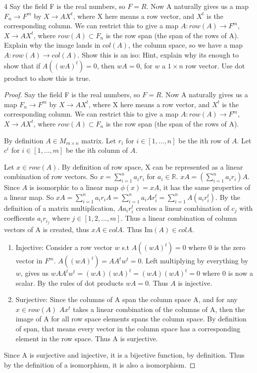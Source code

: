 \documentclass{article}
\newcommand{\R}{\mathbb{R}}
\newcommand{\rarr}[0]{\rightarrow}
\newcommand{\IM}[1]{\text{Im}(#1)}
\begin{document}
\bigskip

\begin{PROB}{4}\label{Problem 4.}
	Say the field F is the real numbers, so $F = R$. Now A naturally gives us a map $F_n \rarr F^m$ by $X \rarr A X^t$, where X here means a row vector, and $X^t$ is the corresponding column. We can restrict this to give a map $A: row(A) \rarr F^m$, $X \rarr AX^t$, where $row(A) \subset F_n$ is the row span (the span of the rows of A). Explain why the image lands in $col(A)$, the column space, so we have a map $A: row(A) \rarr col(A)$.  Show this is an iso: Hint, explain why its enough to show that if  $A( (w A)^t) = 0$, then $wA = 0$, for $w$ a $1 \times n$ row vector.  Use dot product to show this is true.
\end{PROB}
\begin{proof}
	Say the field F is the real numbers, so $F = R$. Now A naturally gives us a map $F_n \rarr F^m$ by $X \rarr A X^t$, where X here means a row vector, and $X^t$ is the corresponding column. We can restrict this to give a map $A: row(A) \rarr F^m$, $X \rarr AX^t$, where $row(A) \subset F_n$ is the row span (the span of the rows of A).

	By definition $A \in M_{m \times n}$ matrix. Let $r_i$ for $i \in [1, ..., n]$ be the ith row of $A$. Let $c^i$ for $i \in [1, \ldots, m]$ be the ith column of $A$. 
	
	
	Let $x \in row(A)$. By definition of row space, X can be represented as a linear combination of row vectors. So $x = \sum_{i = 1}^{n}a_ir_i$ for $a_i \in \R$. $xA = (\sum_{i = 1}^{n}a_ir_i)A$. Since $A$ is isomorphic to a linear map $\phi(x) = xA$, it has the same properties of a linear map. So $xA = \sum_{i = 1}^n a_ir_iA = \sum_{i = 1}^n a_iAr_i^t = \sum_{i = 1}^n A(a_ir_i^t)$. By the definition of a matrix multiplication, $Aa_ir_i^t$ creates a linear combination of $c_j$ with coefficents $a_ir_{i_j}$ where $j \in [1, 2, ..., m]$. Thus a linear combination of column vectors of A is created, thus $xA \in col A$. Thus $\IM{A} \in col A$.
	
	\begin{enumerate}{}
		\item Injective: Consider a row vector $w$ s.t $A((wA)^t) = 0$ where $0$ is the zero vector in $F^m$. $A((wA)^t) = AA^tw^t = 0$. Left multiplying by everything by $w$, gives us $wAA^tw^t = (wA)(wA)^t = (wA)(wA)^t = 0$ where 0 is now a scalar. By the rules of dot products $wA = 0$. Thus $A$ is injective.		
		

		\item Surjective: Since the columns of A span the column space A, and for any $x \in row(A)$ $Ax^t$ takes a linear combination of the columns of A, then the image of A for all row space elements spans the column space. By definition of span, that means every vector in the column space has a corresponding element in the row space. Thus A is surjective.
		
	\end{enumerate}

	Since A is surjective and injective, it is a bijective function, by definition. Thus by the definition of a isomorphism, it is also a isomorphism. 
\end{proof}
\pagebreak
\end{document}
